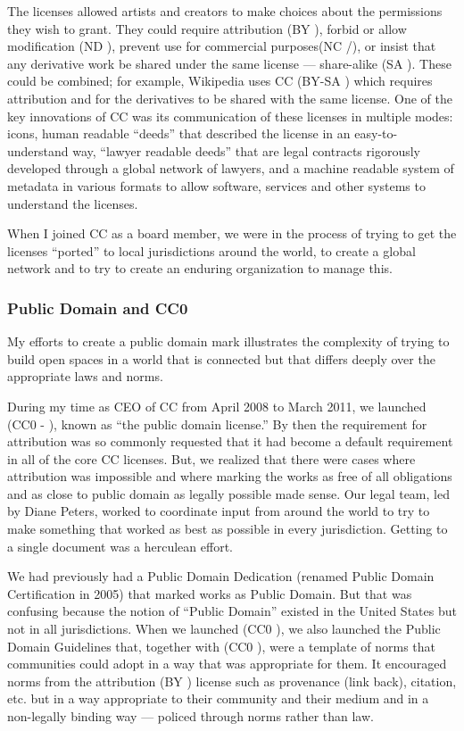 The licenses allowed artists and creators to make choices about the permissions they wish to grant. They could require attribution (BY \ccAttribution), forbid or allow modification (ND \ccNoDerivatives), prevent use for commercial purposes(NC \ccNonCommercial/\ccNonCommercialJP), or insist that any derivative work be shared under the same license --- share-alike (SA \ccShareAlike). These could be combined; for example, Wikipedia uses \ac{CC} (BY-SA \ccbysa) which requires attribution and for the derivatives to be shared with the same license. One of the key innovations of \ac{CC} was its communication of these licenses in multiple modes: icons, human readable ``deeds'' that described the license in an easy-to-understand way, ``lawyer readable deeds'' that are legal contracts rigorously developed through a global network of lawyers, and a machine readable system of metadata in various formats to allow software, services and other systems to understand the licenses.

When I joined \ac{CC} as a board member, we were in the process of trying to get the licenses ``ported'' to local jurisdictions around the world, to create a global network and to try to create an enduring organization to manage this.

\subsubsection{Public Domain and CC0 \ccZero}

My efforts to create a public domain mark illustrates the complexity of trying to build open spaces in a world that is connected but that differs deeply over the appropriate laws and norms.

During my time as CEO of \ac{CC} from April 2008 to March 2011, we launched (CC0 - \ccZero), known as ``the public domain license.'' By then the requirement for attribution was so commonly requested that it had become a default requirement in all of the core \ac{CC} licenses. But, we realized that there were cases where attribution was impossible and where marking the works as free of all obligations and as close to public domain as legally possible made sense. Our legal team, led by Diane Peters, worked to coordinate input from around the world to try to make something that worked as best as possible in every jurisdiction. Getting to a single document was a herculean effort.

We had previously had a Public Domain Dedication (renamed Public Domain Certification in 2005) that marked works as Public Domain. But that was confusing because the notion of ``Public Domain'' existed in the United States but not in all jurisdictions. When we launched (CC0 \ccZero), we also launched the Public Domain Guidelines that, together with (CC0 \ccZero), were a template of norms that communities could adopt in a way that was appropriate for them. It encouraged norms from the attribution (BY \ccAttribution) license such as provenance (link back), citation, etc. but in a way appropriate to their community and their medium and in a non-legally binding way --- policed through norms rather than law.


